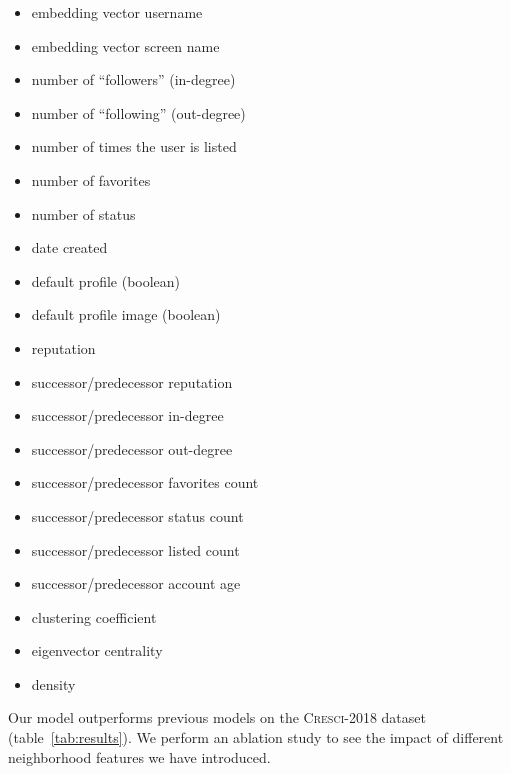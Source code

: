 \begin{multicols}{2}
\begin{itemize}
    \item embedding vector username
    \item embedding vector screen name
    \item number of “followers” (in-degree)
    \item number of “following” (out-degree)
    \item number of times the user is listed
    \item number of favorites
    \item number of status
    \item date created
    \item default profile (boolean)
    \item default profile image (boolean)
    \item reputation
    \item successor/predecessor reputation
    \item successor/predecessor in-degree
    \item successor/predecessor out-degree
    \item successor/predecessor favorites count
    \item successor/predecessor status count
    \item successor/predecessor listed count
    \item successor/predecessor account age
    \item clustering coefficient
    \item eigenvector centrality
    \item density
\end{itemize}
\end{multicols}

\noindent Our model outperforms previous models on the \textsc{Cresci-2018} dataset (table~\ref{tab:results}). We perform an ablation study to see the impact of different neighborhood features we have introduced.

